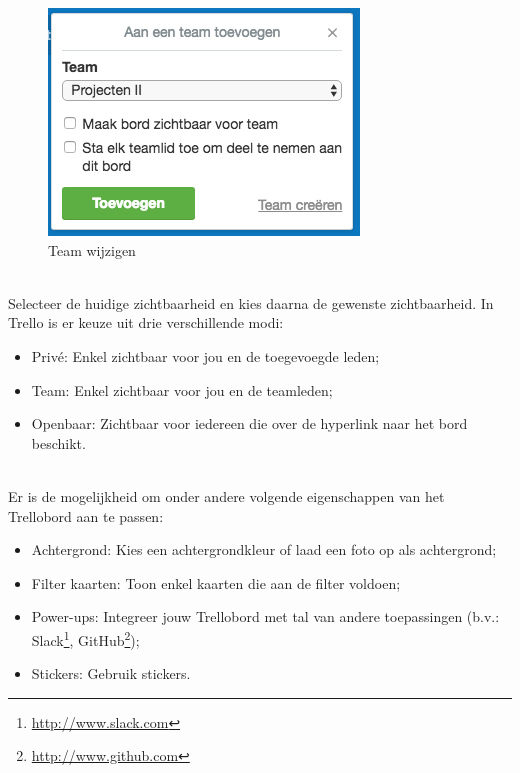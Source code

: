 \begin{figure}[H]
	\centering
	\includegraphics[scale=0.5]{./afbeeldingen/wijzig_team.png}
	\caption{Team wijzigen}
	\label{fig:wijzig_Team}	
\end{figure} 

\noindent
\\Selecteer de huidige zichtbaarheid en kies daarna de gewenste zichtbaarheid. In Trello is er keuze uit drie verschillende modi:
\begin{itemize}
	\item Priv\'e: Enkel zichtbaar voor jou en de toegevoegde leden;
	\item Team: Enkel zichtbaar voor jou en de teamleden;
	\item Openbaar:  Zichtbaar voor iedereen die over de hyperlink naar het bord beschikt.
\end{itemize}	

\pagebreak

\noindent
\\Er is de mogelijkheid om onder andere volgende eigenschappen van het Trellobord aan te passen:
\begin{itemize}
	\item Achtergrond: Kies een achtergrondkleur of laad een foto op als achtergrond;
	\item Filter kaarten: Toon enkel kaarten die aan de filter voldoen;
	\item Power-ups: Integreer jouw Trellobord met tal van andere toepassingen (b.v.: Slack\footnote{\url{http://www.slack.com}}, GitHub\footnote{\url{http://www.github.com}});
	\item Stickers: Gebruik stickers.
\end{itemize}